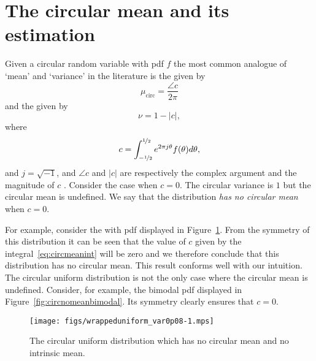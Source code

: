 \documentclass[journal]{IEEEtran}
\begin{document}
\section{The circular mean and its estimation}\label{sec:circ-mean-vari}

Given a circular random variable with pdf $f$ the most common analogue of `mean' and `variance' in the literature is the  given by 
\[
\mu_{\text{circ}} = \frac{\angle{c}}{2\pi}
\] 
and the  given by 
\[
\nu = 1 - |c|,
\]  
where 
\begin{equation}\label{eq:circmeanint}
c = \int_{-\nicefrac{1}{2}}^{\nicefrac{1}{2}} e^{2\pi j \theta} f(\theta) d\theta,
\end{equation} 
and $j = \sqrt{-1}$, and $\angle{c}$ and $|c|$ are respectively the complex argument and the magnitude of $c$ \cite[p.~29]{Mardia_directional_statistics}\cite{Fisher1993}. Consider the case when $c = 0$. The circular variance is $1$ but the circular mean is undefined.  We say that the distribution \emph{has no circular mean} when $c = 0$. %

For example, consider the  with pdf displayed in Figure~\ref{fig:circularuniformdist}.  From the symmetry of this distribution it can be seen that the value of $c$ given by the integral~\eqref{eq:circmeanint} will be zero and we therefore conclude that this distribution has no circular mean.  This result conforms well with our intuition. The circular uniform distribution is not the only case where the circular mean is undefined. Consider, for example, the bimodal pdf displayed in Figure~\ref{fig:circnomeanbimodal}. Its symmetry clearly ensures that $c = 0$.


\begin{figure}[tp]
	\centering 
		\texttt{[image: figs/wrappeduniform\_var0p08-1.mps]}
		\caption{The circular uniform distribution which has no circular mean and no intrinsic mean.}
		\label{fig:circularuniformdist}
\end{figure}
\end{document}
